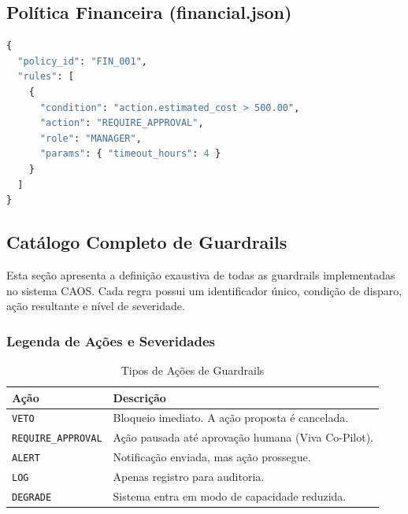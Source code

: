 \documentclass[12pt, a4paper]{article}
\begin{document}
\subsection{Política Financeira (financial.json)}
\begin{lstlisting}[language=Python, caption=Regra de Aprovação de Custos]
{
  "policy_id": "FIN_001",
  "rules": [
    {
      "condition": "action.estimated_cost > 500.00",
      "action": "REQUIRE_APPROVAL",
      "role": "MANAGER",
      "params": { "timeout_hours": 4 }
    }
  ]
}
\end{lstlisting}


\subsection{Catálogo Completo de Guardrails}
\label{sec:guardrails_catalog}

Esta seção apresenta a definição exaustiva de todas as guardrails implementadas no sistema CAOS. Cada regra possui um identificador único, condição de disparo, ação resultante e nível de severidade.

\subsubsection{Legenda de Ações e Severidades}

\begin{table}[h!]
\centering
\small
\begin{tabular}{|l|p{10cm}|}
\hline
\textbf{Ação} & \textbf{Descrição} \\ \hline
\texttt{VETO} & Bloqueio imediato. A ação proposta é cancelada. \\ \hline
\texttt{REQUIRE\_APPROVAL} & Ação pausada até aprovação humana (Viva Co-Pilot). \\ \hline
\texttt{ALERT} & Notificação enviada, mas ação prossegue. \\ \hline
\texttt{LOG} & Apenas registro para auditoria. \\ \hline
\texttt{DEGRADE} & Sistema entra em modo de capacidade reduzida. \\ \hline
\end{tabular}
\caption{Tipos de Ações de Guardrails}
\end{table}
\end{document}
